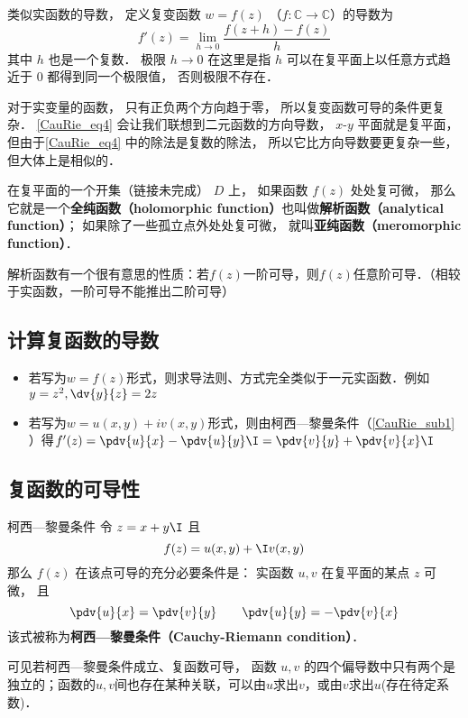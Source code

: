 
\begin{issues}
\issueTODO
\end{issues}


\begin{definition}{}
类似实函数的导数， 定义复变函数 $w = f(z)$ （$f:\mathbb C\to \mathbb C$）的导数为
\begin{equation}\label{CauRie_eq4}
f'(z) = \lim_{h\to 0} \frac{f(z + h) - f(z)}{h}
\end{equation}
其中 $h$ 也是一个复数． 极限 $h \to 0$ 在这里是指 $h$ 可以在复平面上以任意方式趋近于 $0$ 都得到同一个极限值， 否则极限不存在．
\end{definition}

对于实变量的函数， 只有正负两个方向趋于零， 所以复变函数可导的条件更复杂． \autoref{CauRie_eq4} 会让我们联想到二元函数的方向导数， $x$-$y$ 平面就是复平面， 但由于\autoref{CauRie_eq4} 中的除法是复数的除法， 所以它比方向导数要更复杂一些， 但大体上是相似的．

在复平面的一个开集（链接未完成） $D$ 上， 如果函数 $f(z)$ 处处复可微， 那么它就是一个\textbf{全纯函数（holomorphic function）}也叫做\textbf{解析函数（analytical function）}； 如果除了一些孤立点外处处复可微， 就叫\textbf{亚纯函数（meromorphic function）}．

解析函数有一个很有意思的性质：若$f(z)$一阶可导，则$f(z)$任意阶可导．（相较于实函数，一阶可导不能推出二阶可导）

\subsection{计算复函数的导数}
\begin{itemize}
\item 若写为$w=f(z)$形式，则求导法则、方式完全类似于一元实函数．例如$y=z^2, \dv{y}{z}=2z$
\item 若写为$w=u(x,y)+iv(x,y)$形式，则由柯西—黎曼条件（\autoref{CauRie_sub1} ）得$f'(z) = \pdv{u}{x} -\pdv{u}{y} \I = \pdv{v}{y} + \pdv{v}{x}\I$
\end{itemize}

\subsection{复函数的可导性}\label{CauRie_sub1}
\begin{theorem}{柯西—黎曼条件}
令 $z = x + y\I$ 且
\begin{equation}
f(z) = u(x, y) + \I v(x, y)
\end{equation}
那么 $f(z)$ 在该点可导的充分必要条件是： 实函数 $u,v$ 在复平面的某点 $z$ 可微， 且
\begin{equation}\label{CauRie_eq1}
\pdv{u}{x} = \pdv{v}{y} \qquad
\pdv{u}{y} = - \pdv{v}{x}
\end{equation}
该式被称为\textbf{柯西—黎曼条件（Cauchy-Riemann condition）}．
\end{theorem}
可见若柯西—黎曼条件成立、复函数可导， 函数 $u,v$ 的四个偏导数中只有两个是独立的；函数的$u,v$间也存在某种关联，可以由$u$求出$v$，或由$v$求出$u$(存在待定系数)．

